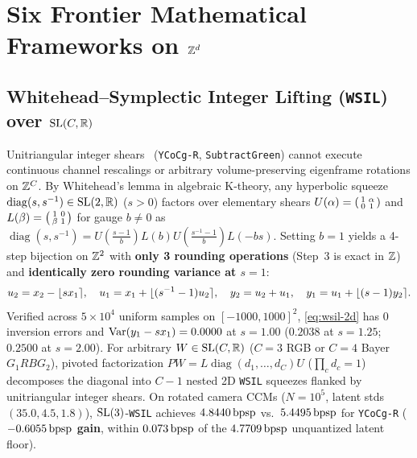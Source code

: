 \section{Six Frontier Mathematical Frameworks on \texorpdfstring{$\mathbb{Z}^d$}{Z\textasciicircum d}}
\label{sec:frameworks}

\subsection{Whitehead--Symplectic Integer Lifting (\texttt{WSIL}) over \texorpdfstring{$\mathrm{SL}(C, \mathbb{R})$}{SL(C, R)}}
Unitriangular integer shears~\citep{sweldens1998,hoogeboom2019idf} (\texttt{YCoCg-R}, \texttt{SubtractGreen}) cannot execute continuous channel rescalings or arbitrary volume-preserving eigenframe rotations on $\mathbb{Z}^C$. By Whitehead's lemma in algebraic K-theory, any hyperbolic squeeze $\operatorname{diag}(s, s^{-1}) \in \mathrm{SL}(2,\mathbb{R})$ ($s>0$) factors over elementary shears $U(\alpha) = \begin{psmallmatrix}1 & \alpha\\0 & 1\end{psmallmatrix}$ and $L(\beta) = \begin{psmallmatrix}1 & 0\\\beta & 1\end{psmallmatrix}$ for gauge $b \neq 0$ as $\operatorname{diag}(s,s^{-1}) = U(\frac{s-1}{b})L(b)U(\frac{s^{-1}-1}{b})L(-bs)$. Setting $b=1$ yields a 4-step bijection on $\mathbb{Z}^2$ with \textbf{only 3 rounding operations} (Step~3 is exact in $\mathbb{Z}$) and \textbf{identically zero rounding variance at $s = 1$}:
\begin{equation}
  u_2 = x_2 - \lfloor s x_1 \rceil, \quad
  u_1 = x_1 + \lfloor (s^{-1}-1)u_2 \rceil, \quad
  y_2 = u_2 + u_1, \quad
  y_1 = u_1 + \lfloor (s-1)y_2 \rceil.
  \label{eq:wsil-2d}
\end{equation}
Verified across $5\times 10^4$ uniform samples on $[-1000,1000]^2$, \eqref{eq:wsil-2d} has $0$ inversion errors and $\operatorname{Var}(y_1 - sx_1) = 0.0000$ at $s=1.00$ ($0.2038$ at $s=1.25$; $0.2500$ at $s=2.00$). For arbitrary $W \in \mathrm{SL}(C,\mathbb{R})$ ($C=3$ RGB or $C=4$ Bayer $G_1 R B G_2$), pivoted factorization $PW = L\operatorname{diag}(d_1,\dots,d_C)U$ ($\prod_c d_c = 1$) decomposes the diagonal into $C-1$ nested 2D \texttt{WSIL} squeezes flanked by unitriangular integer shears. On rotated camera CCMs ($N=10^5$, latent stds $(35.0, 4.5, 1.8)$), $\mathrm{SL}(3)$-\texttt{WSIL} achieves $4.8440\,\mathrm{bpsp}$ vs.\ $5.4495\,\mathrm{bpsp}$ for \texttt{YCoCg-R} (\textbf{$-0.6055\,\mathrm{bpsp}$ gain}, within $0.073\,\mathrm{bpsp}$ of the $4.7709\,\mathrm{bpsp}$ unquantized latent floor).

